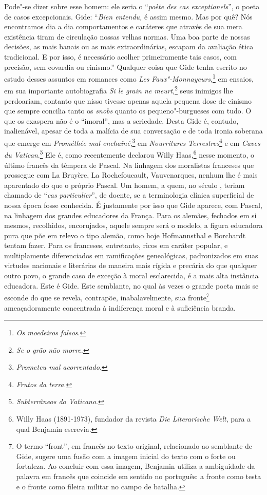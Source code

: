 Pode"-se dizer sobre esse homem: ele seria o ``\emph{poète des cas
exceptionels}'', o poeta de casos excepcionais. Gide: ``\emph{Bien
entendu,} é assim mesmo. Mas por quê? Nós encontramos dia a dia
comportamentos e caráteres que através de sua mera existência tiram de
circulação nossas velhas normas. Uma boa parte de nossas decisões, as
mais banais ou as mais extraordinárias, escapam da avaliação ética
tradicional. E por isso, é necessário acolher primeiramente tais casos,
com precisão, sem covardia ou cinismo.'' Qualquer coisa que Gide tenha
escrito no estudo desses assuntos em romances como \emph{Les}
\emph{Faux"-Monnayeurs},\footnote{\emph{Os moedeiros falsos}. \versal{[N. T.]}}
em ensaios, em sua importante autobiografia \emph{Si le grain ne meurt},\footnote{\emph{Se o grão não morre.} \versal{[N. T.]}} seus inimigos lhe
perdoariam, contanto que nisso tivesse apenas aquela pequena dose de
cinismo que sempre concilia tanto os \emph{snobs} quanto os
pequeno"-burgueses com tudo. O que os exaspera não é o ``imoral'', mas a
seriedade. Desta Gide é, contudo, inalienável, apesar de toda a malícia
de sua conversação e de toda ironia soberana que emerge em
\emph{Prométhée mal enchaîné},\footnote{\emph{Prometeu mal
  acorrentado}. \versal{[N. T.]}} em \emph{Nourritures Terrestres}\footnote{\emph{Frutos da terra}. \versal{[N. T.]}} e em \emph{Caves du Vatican}.\footnote{\emph{Subterrâneos do Vaticano}. \versal{[N. T.]}} Ele é, como recentemente declarou Willy Haas,\footnote{Willy Haas (1891-1973), fundador da revista \emph{Die
  Literarische Welt}, para a qual Benjamin escrevia. \versal{[N. E.]}} nesse momento, o
último francês da têmpera de Pascal. Na linhagem dos moralistas
franceses que prossegue com La Bruyère, La Rochefoucault, Vauvenarques,
nenhum lhe é mais aparentado do que o próprio Pascal. Um homem, a quem,
no século , teriam chamado de ``\emph{cas particulier}'', de doente,
se a terminologia clínica superficial de nossa época fosse conhecida. É
justamente por isso que Gide aparece, com Pascal, na linhagem dos
grandes educadores da França. Para os alemães, fechados em si mesmos,
recolhidos, encorujados, aquele sempre será o modelo, a figura educadora
pura que põe em relevo o tipo alemão, como hoje Hofmannsthal e Borchardt
tentam fazer. Para os franceses, entretanto, ricos em caráter popular,
e multiplamente diferenciados em ramificações genealógicas, padronizados
em suas virtudes nacionais e literárias de maneira mais rígida e
precária do que qualquer outro povo, o grande caso de exceção à moral
esclarecida, é a mais alta instância educadora. Este é Gide. Este
semblante, no qual às vezes o grande poeta mais se esconde do que se
revela, contrapõe, inabalavelmente, sua fronte\footnote{O termo
  ``front'', em francês no texto original, relacionado ao semblante de
  Gide, sugere uma fusão com a imagem inicial do texto com o forte ou
  fortaleza. Ao concluir com essa imagem, Benjamin utiliza a ambiguidade
  da palavra em francês que coincide em sentido no português: a fronte
  como testa e o fronte como fileira militar no campo de batalha. \versal{[N. T.]}}
ameaçadoramente concentrada à indiferença moral e à suficiência branda.
